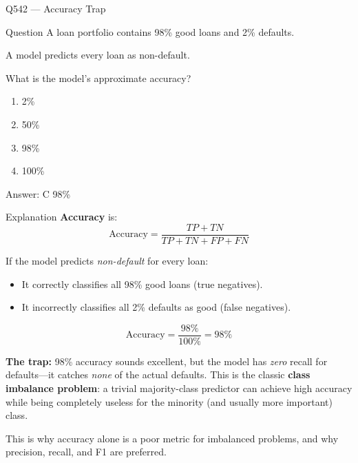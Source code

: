 \documentclass[aspectratio=169,8pt]{beamer}
\begin{document}
	\begin{frame}{Q542 --- Accuracy Trap}
		\begin{block}{Question}
			A loan portfolio contains 98\% good loans and 2\% defaults.
			
			A model predicts every loan as non-default.
			
			What is the model's approximate accuracy?
			\begin{enumerate}
				\item 2\%
				\item 50\%
				\item 98\%
				\item 100\%
			\end{enumerate}
		\end{block}
		
		\begin{exampleblock}{Answer: C}
			98\%
		\end{exampleblock}
		
		\begin{block}{Explanation}
			\textbf{Accuracy} is:
			\[
			\text{Accuracy} = \frac{TP + TN}{TP + TN + FP + FN}
			\]
			
			If the model predicts \emph{non-default} for every loan:
			\begin{itemize}
				\item It correctly classifies all 98\% good loans (true negatives).
				\item It incorrectly classifies all 2\% defaults as good (false negatives).
			\end{itemize}
			
			\[
			\text{Accuracy} = \frac{98\%}{100\%} = 98\%
			\]
			
			\textbf{The trap:} 98\% accuracy sounds excellent, but the model has
			\emph{zero} recall for defaults---it catches \emph{none} of the actual
			defaults. This is the classic \textbf{class imbalance problem}: a trivial
			majority-class predictor can achieve high accuracy while being completely
			useless for the minority (and usually more important) class.
			
			This is why accuracy alone is a poor metric for imbalanced problems, and
			why precision, recall, and F1 are preferred.
		\end{block}
	\end{frame}
	
\end{document}
